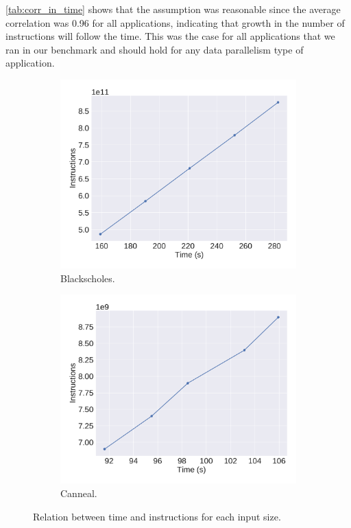 \cref{tab:corr_in_time} shows that the assumption was reasonable since the average correlation was 0.96 for all applications, indicating that growth in the number of instructions  will follow the time. This was the case for all applications that we ran in our benchmark and should hold for any data parallelism type of application.
\begin{figure}[H]
	\centering
	\captionsetup[subfigure]{justification=centering}
	\begin{subfigure}[b]{0.45\textwidth}
		\includegraphics[width=\columnwidth]{models/figures/hypothesis/input_instructions/input_time/blackscholes.pdf}
		\caption{Blackscholes.}
		\label{fig:time_input_blackshoels}
	\end{subfigure}
	\begin{subfigure}[b]{0.45\textwidth}
		\includegraphics[width=\columnwidth]{models/figures/hypothesis/input_instructions/input_time/canneal.pdf}
		\caption{Canneal.}
		\label{fig:time_input_canneal}
	\end{subfigure}
	
	\hfill
	\caption{Relation between time and instructions for each input size. }
	\label{fig:time_input}
\end{figure}
\vspace{-6pt}

